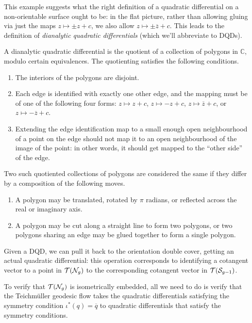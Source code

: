 \documentclass[12pt, reqno]{amsart}
\begin{document}
This example suggests what the right definition of a quadratic differential on a non-orientable surface ought to be: in the flat picture, rather than allowing gluing via just the maps $z \mapsto \pm z + c$, we also allow $z \mapsto \pm \overline{z} + c$.
This leads to the definition of \emph{dianalytic quadratic differentials} (which we'll abbreviate to DQDs).

\begin{definition}
  A dianalytic quadratic differential is the quotient of a collection of polygons in $\mathbb{C}$, modulo
  certain equivalences.  The quotienting satisfies the following conditions.
  \begin{enumerate}[(1)]
  \item The interiors of the polygons are disjoint.
  \item Each edge is identified with exactly one other edge, and the mapping must be of one of the following
    four forms: $z \mapsto z + c$, $z \mapsto -z + c$, $z \mapsto \overline{z} + c$, or
    $z \mapsto -\overline{z} + c$.
  \item Extending the edge identification map to a small enough open neighbourhood of a point on the edge
    should not map it to an open neighbourhood of the image of the point: in other words, it should get mapped
    to the ``other side'' of the edge.
  \end{enumerate}
  Two such quotiented collections of polygons are considered the same if they differ by a composition of the following
  moves.
  \begin{enumerate}[(1)]
  \item A polygon may be translated, rotated by $\pi$ radians, or reflected across the real or imaginary axis.
  \item A polygon may be cut along a straight line to form two polygons, or two polygons sharing an edge may
    be glued together to form a single polygon.
  \end{enumerate}
\end{definition}

Given a DQD, we can pull it back to the orientation double cover, getting an actual quadratic differential: this operation corresponds to identifying a cotangent vector to a point in $\mathcal{T}(\mathcal{N}_g)$ to the corresponding cotangent vector in $\mathcal{T}(\mathcal{S}_{g-1})$.

To verify that $\mathcal{T}(\mathcal{N}_g)$ is isometrically embedded, all we need to do is verify that the Teichm\"uller geodesic flow takes the quadratic differentials satisfying the symmetry condition $\iota^{\ast}(q) = \overline{q}$ to quadratic differentials that satisfy the symmetry conditions.
\end{document}
